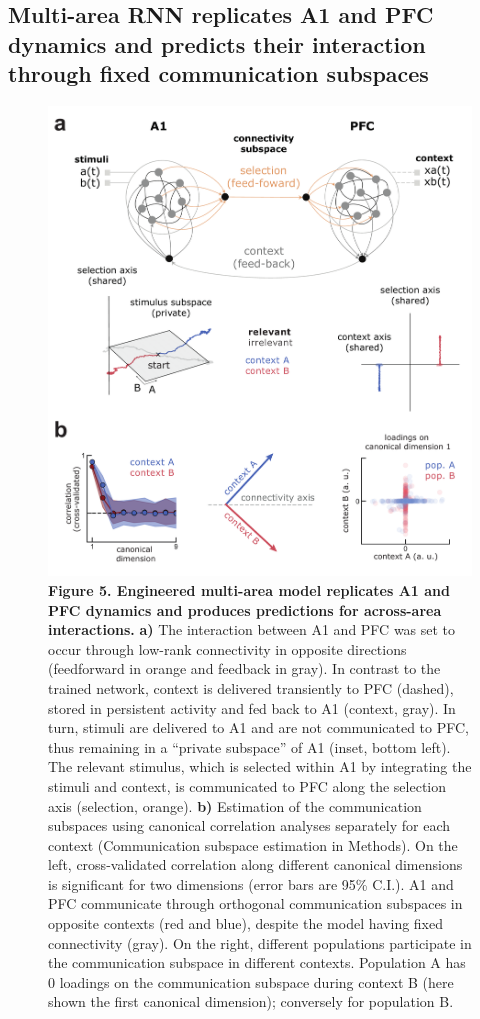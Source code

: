 \documentclass[12pt]{article}
\begin{document}
\subsection*{Multi-area RNN replicates A1 and PFC dynamics and predicts their interaction through fixed communication subspaces}


\begin{figure}
\centering
        \includegraphics[width=\textwidth]{figures/Fig5.pdf}
    \caption{\textbf{Figure 5. Engineered multi-area model replicates A1 and PFC dynamics and produces predictions for across-area interactions.} \textbf{a)} The interaction between A1 and PFC was set to occur through low-rank connectivity in opposite directions (feedforward in orange and feedback in gray). In contrast to the trained network, context is delivered transiently to PFC (dashed), stored in persistent activity and fed back to A1 (context, gray). In turn, stimuli are delivered to A1 and are not communicated to PFC, thus remaining  in a “private subspace” of A1 (inset, bottom left). The relevant stimulus, which is selected within A1 by integrating the stimuli and context, is communicated to PFC along the selection axis (selection, orange). \textbf{b)} Estimation of the communication subspaces using canonical correlation analyses separately for each context (Communication subspace estimation in Methods). On the left, cross-validated correlation along different canonical dimensions is significant for two dimensions (error bars are 95\% C.I.). A1 and PFC communicate through orthogonal communication subspaces in opposite contexts (red and blue), despite the model having fixed connectivity (gray). On the right, different populations participate in the communication subspace in different contexts. Population A has 0 loadings on the communication subspace during context B (here shown the first canonical dimension); conversely for population B.} 
    \label{fig5}
\end{figure}
\end{document}
